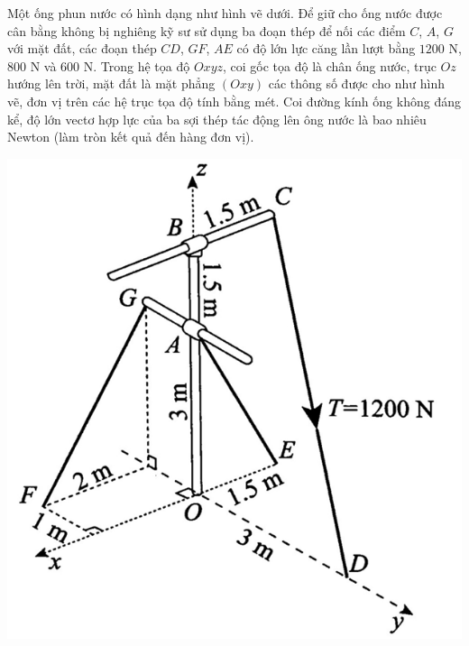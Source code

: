 \begin{ex}%
	Một ống phun nước có hình dạng như hình vẽ dưới. Để giữ cho ống nước được cân bằng không bị nghiêng kỹ sư sử dụng ba đoạn thép để nối các điểm $C$, $A$, $G$ với mặt đất, các đoạn thép $CD$, $GF$, $AE$ có độ lớn lực căng lần lượt bằng $1200$ N, $800$ N và $600$ N. Trong hệ tọa độ $Oxyz$, coi gốc tọa độ là chân ống nước, trục $Oz$ hướng lên trời, mặt đất là mặt phẳng $(Oxy)$ các thông số được cho như hình vẽ, đơn vị trên các hệ trục tọa độ tính bằng mét. Coi đường kính ống không đáng kể, độ lớn vectơ hợp lực của ba sợi thép tác động lên ông nước là bao nhiêu Newton (làm tròn kết quả đến hàng đơn vị).
	\begin{center}
		\includegraphics[scale=0.45]{images/de7-1}
	\end{center}
\end{ex}
